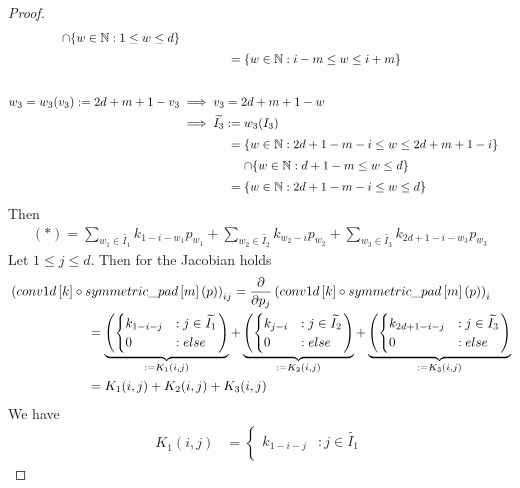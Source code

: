 \documentclass[twoside,a4paper]{article}
\begin{document}
\begin{proof}
\begin{align*}
		\cap \{ w \in \mathbb{N} : 1 \leq w \leq d \}  \\
		&\phantomrel{\implies \widetilde{I_2} :}
		= \{ w \in \mathbb{N} : i-m \leq w \leq i+m \} \\[20pt]
		w_3 = w_3(v_3) := 2d+m+1-v_3 &\implies v_3=2d+m+1-w \\
		&\implies \widetilde{I_3} := w_3(I_3) \\
		& \phantomrel{\implies \widetilde{I_3} :}
		= \{ w \in \mathbb{N} : 2d+1-m-i \leq w \leq 2d+m+1-i \} \\
		& \phantomrel{\implies \widetilde{I_3} :=}
		\cap \{ w \in \mathbb{N} : d+1-m \leq w \leq d \} \\
		& \phantomrel{\implies \widetilde{I_3} :}
		= \{ w \in \mathbb{N} : 2d+1-m-i \leq w \leq d \}
	\end{align*}
	Then
	\begin{align*}
		(*) = \sum_{w_1 \in \widetilde{I_1}} k_{1-i-w_1} p_{w_1} +
		\sum_{w_2 \in \widetilde{I_2}} k_{w_2-i} p_{w_2} +
		\sum_{w_3 \in \widetilde{I_3}} k_{2d+1-i-w_3} p_{w_3}
	\end{align*}
	Let $ 1 \leq j \leq d$. Then for the Jacobian holds
	\begin{align*}
		\hspace{6em}&\hspace{-6em}
		\lb conv1d \lsb k \rsb \circ symmetric\_pad \lsb m \rsb(p) \rb_{ij}
		= \deldel{p_j} \lb conv1d \lsb k \rsb \circ symmetric\_pad \lsb m \rsb(p) \rb_i \\
		&= \underbrace{\lb \begin{cases}
			k_{1-i-j} & : j \in \widetilde{I_1} \\
			0 & : else
		\end{cases} \rb}_{:= K_1(i,j)} + \underbrace{\lb \begin{cases}
			k_{j-i} & : j \in \widetilde{I_2} \\
			0 & : else
		\end{cases} \rb}_{:= K_2(i,j)} + \underbrace{\lb \begin{cases}
			k_{2d+1-i-j} & : j \in \widetilde{I_3} \\
			0 & : else
		\end{cases} \rb}_{:= K_3(i,j)} \\
		&= K_1(i,j) + K_2(i,j) + K_3(i,j)
	\end{align*}
	We have
	\begin{align*}
		 K_1(i,j) &= \begin{cases}
			k_{1-i-j} & : j \in \widetilde{I_1} \\

\end{cases}
\end{align*}
\end{proof}
\end{document}
